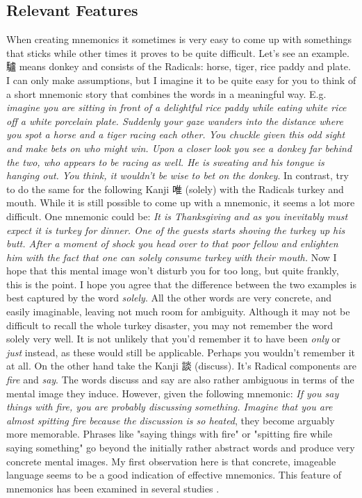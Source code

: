 \subsection{Relevant Features} \label{sec:body_relevant_features}

When creating mnemonics it sometimes is very easy to come up with somethings that sticks while other times it proves to be quite difficult. Let's see an example. 驢 means donkey and consists of the Radicals: horse, tiger, rice paddy and plate. I can only make assumptions, but I imagine it to be quite easy for you to think of a short mnemonic story that combines the words in a meaningful way. E.g. \emph{imagine you are sitting in front of a delightful rice paddy while eating white rice off a white porcelain plate. Suddenly your gaze wanders into the distance where you spot a horse and a tiger racing each other. You chuckle given this odd sight and make bets on who might win. Upon a closer look you see a donkey far behind the two, who appears to be racing as well. He is sweating and his tongue is hanging out. You think, it wouldn't be wise to bet on the donkey}. In contrast, try to do the same for the following Kanji 唯 (solely) with the Radicals turkey and mouth. While it is still possible to come up with a mnemonic, it seems a lot more difficult. One mnemonic could be: \emph{It is Thanksgiving and as you inevitably must expect it is turkey for dinner. One of the guests starts shoving the turkey up his butt.  After a moment of shock you head over to that poor fellow and  enlighten him with the fact that one can solely consume turkey with their mouth.} Now I hope that this mental image won't disturb you for too long, but quite frankly, this is the point. I hope you agree that the difference between the two examples is best captured by the word \emph{solely}. All the other words are very concrete, and easily imaginable, leaving not much room for ambiguity. Although it may not be difficult to recall the whole turkey disaster, you may not remember the word solely very well. It is not unlikely that you'd remember it to have been \emph{only} or \emph{just} instead, as these would still be applicable. Perhaps you wouldn't remember it at all. On the other hand take the Kanji 談 (discuss). It's Radical components are \emph{fire} and \emph{say}. The words discuss and say are also rather ambiguous in terms of the mental image they induce. However, given the following mnemonic: \emph{If you say things with fire, you are probably discussing something. Imagine that you are almost spitting fire because the discussion is so heated}, they become arguably more memorable. Phrases like "saying things with fire" or "spitting fire while saying something" go beyond the initially rather abstract words and produce very concrete mental images. My first observation here is that concrete, imageable language seems to be a good indication of effective mnemonics. This feature of mnemonics has been examined in  several studies \cite{campos_2004} \cite{campos_2011} \cite{kordjazi2014effect}.

